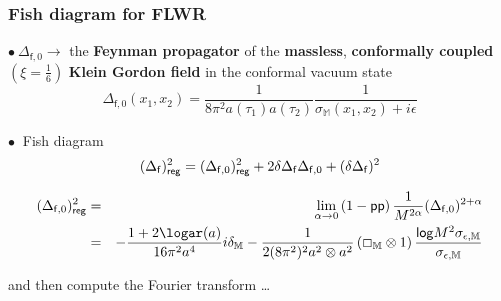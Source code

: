 \documentclass[9pt]{beamer}
\renewcommand{\log}{\mathsf{log}}
\newcommand{\pp}{\mathsf{pp}}
\newcommand{\Mbb}{\mathbb{M}}
\newcommand{\fsf}{\mathsf{f}}
\begin{document}
\begin{frame}

\frametitle{Fish diagram for FLWR} 

$\bullet \ \Delta_{\fsf,0} \to$ the \textbf{Feynman propagator} of the \textbf{massless}, \textbf{conformally coupled} $(\xi = \frac16)$ \textbf{Klein Gordon field} in the conformal vacuum state 
\begin{equation*}
\Delta_{\fsf,0}(x_1,x_2)=\frac{1}{8\pi^2 a(\tau_1)a(\tau_2)}\frac{1}{\sigma_{\Mbb}(x_1,x_2)+i\epsilon} 
\end{equation*}

$\bullet \ $ Fish diagram
\vspace*{-12pt}
\begin{equation*}
(\Delta_\fsf)^2_\mathsf{reg} = (\Delta_{\fsf,0})^2_\mathsf{reg} + 2 \delta\Delta_\fsf \Delta_{\fsf,0} + (\delta\Delta_\fsf)^2
\vspace*{-25pt}
\end{equation*}

\begin{eqnarray*}
(\Delta_{\fsf,0})^2_\mathsf{reg} &=& 
\lim_{\alpha\to 0} \left( 1 - \pp \right) \frac{1}{M^{2\alpha}} (\Delta_{\fsf,0})^{2+\alpha} \\
&=& - \frac{1+2\logar(a)}{16\pi^2 a^4} i\delta_\Mbb-\frac{1}{2(8\pi^2)^2 a^2\otimes a^2} \left(\Box_{\Mbb}\otimes 1\right)\frac{\log{M^2\sigma_{\epsilon,\Mbb}}}{\sigma_{\epsilon,\Mbb}}
\end{eqnarray*}

and then compute the Fourier transform \dots

\end{frame}




\end{document}
